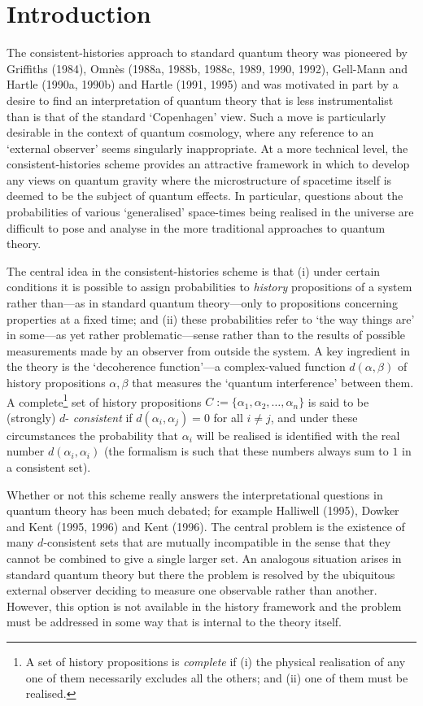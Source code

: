 \documentclass[12pt]{article}
\let\ssection=\section
\renewcommand{\section}{\setcounter{equation}{0}\ssection}
\newcounter{def-number}[section]
\renewcommand{\a}{\alpha}                   %
\renewcommand{\b}{\beta}                    %
\begin{document}
\section{Introduction}
The consistent-histories approach to standard quantum theory was
pioneered by Griffiths (1984), Omn\`es (1988a, 1988b, 1988c, 1989,
1990, 1992), Gell-Mann and Hartle (1990a, 1990b) and Hartle (1991,
1995) and was motivated in part by a desire to find an
interpretation of quantum theory that is less instrumentalist than
is that of the standard `Copenhagen' view. Such a move is
particularly desirable in the context of quantum cosmology, where
any reference to an `external observer' seems singularly
inappropriate. At a more technical level, the consistent-histories
scheme provides an attractive framework in which to develop any
views on quantum gravity where the microstructure of spacetime
itself is deemed to be the subject of quantum effects. In
particular, questions about the probabilities of various
`generalised' space-times being realised in the universe are
difficult to pose and analyse in the more traditional approaches to
quantum theory.

	The central idea in the consistent-histories scheme is that (i)
under certain conditions it is possible to assign probabilities to
{\em history\/} propositions of a system rather than---as in
standard quantum theory---only to propositions concerning properties
at a fixed time; and (ii) these probabilities refer to `the way
things are' in some---as yet rather problematic---sense rather than
to the results of possible measurements made by an observer from
outside the system. A key ingredient in the theory is the
`decoherence function'---a complex-valued function $d(\a,\b)$ of
history propositions $\a,\b$ that measures the `quantum
interference' between them. A complete\footnote{A set of history
propositions is {\em complete\/} if (i) the physical realisation of
any one of them necessarily excludes all the others; and (ii) one of
them must be realised.} set of history propositions
$C:=\{\a_1,\a_2,\ldots,\a_n\}$ is said to be (strongly) $d$-{\em
consistent\/} if $d(\a_i,\a_j)=0$ for all $i\neq j$, and under these
circumstances the probability that $\a_i$ will be realised is
identified with the real number $d(\a_i,\a_i)$ (the formalism is
such that these numbers always sum to $1$ in a consistent set).

	Whether or not this scheme really answers the interpretational
questions in quantum theory has been much debated; for example
Halliwell (1995), Dowker and Kent (1995, 1996) and Kent (1996). The
central problem is the existence of many $d$-consistent sets that
are mutually incompatible in the sense that they cannot be combined
to give a single larger set.  An analogous situation arises in
standard quantum theory but there the problem is resolved by the
ubiquitous external observer deciding to measure one observable
rather than another. However, this option is not available in the
history framework and the problem must be addressed in some way that
is internal to the theory itself.
\end{document}
